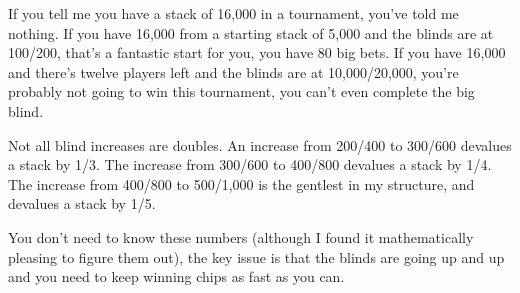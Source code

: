 If you tell me you have a stack of 16,000 in a tournament, you've
told me nothing. If you have 16,000 from a starting stack of 5,000
and the blinds are at 100/200, that's a fantastic start for you, you
have 80 big bets. If you have 16,000 and there's twelve
players left and the blinds are at 10,000/20,000, you're probably
not going to win this tournament, you can't even complete the big blind.

Not all blind increases are doubles. An increase from 200/400 to 300/600
devalues a stack by 1/3. The increase from 300/600 to 400/800 devalues
a stack by 1/4. The increase from 400/800 to 500/1,000 is the gentlest
in my structure, and devalues a stack by 1/5.

You don't need to know these numbers (although I found it mathematically
pleasing to figure them out), the key issue is that the blinds are going up
and up and you need to keep winning chips as fast as you can.


